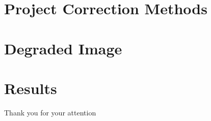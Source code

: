 \documentclass[11pt]{beamer}
\begin{document}
\section{Project Correction Methods}




\section{Degraded Image}


\section{Results}


\begin{frame}
  \centering
  {\Huge Thank you for your attention}
\end{frame}
\end{document}
